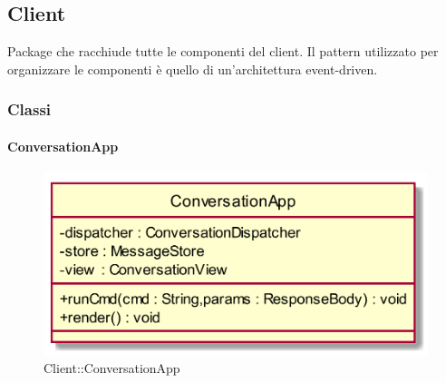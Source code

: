 \subsection{Client}
Package che racchiude tutte le componenti del client. Il pattern utilizzato per organizzare le componenti è quello di un'architettura event-driven.
\subsubsection{Classi}
\hypertarget{ConversationApp_label}{\paragraph{ConversationApp}}
\begin{figure}[h]
	\centering
	\includegraphics[width=\textwidth,height=\textheight,keepaspectratio]{images/ClassConversationApp.png}
	\caption{Client::ConversationApp}
\end{figure}
